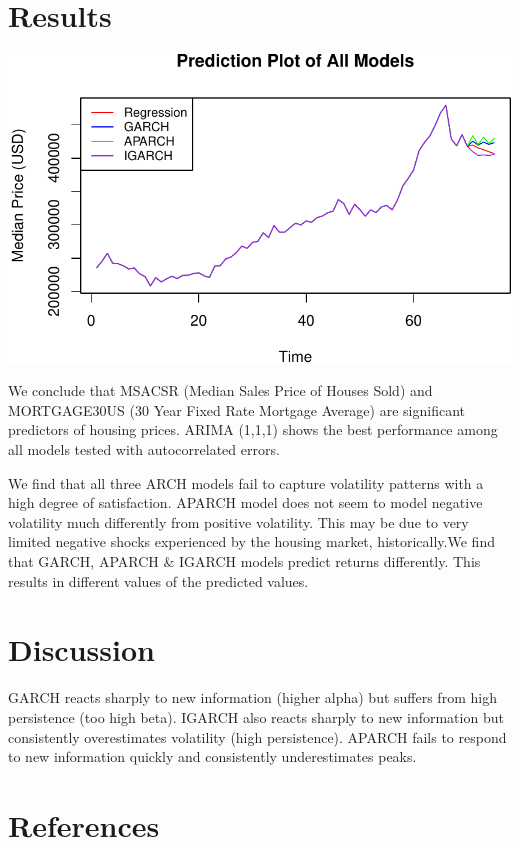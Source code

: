 \documentclass[
  man]{apa6}
\begin{document}
\section{Results}\label{results}

\includegraphics{STAT429Report_files/figure-latex/unnamed-chunk-21-1.pdf}

We conclude that MSACSR (Median Sales Price of Houses Sold) and MORTGAGE30US (30 Year Fixed Rate Mortgage Average) are significant predictors of housing prices. ARIMA (1,1,1) shows the best performance among all models tested with autocorrelated errors.

We find that all three ARCH models fail to capture volatility patterns with a high degree of satisfaction. APARCH model does not seem to model negative volatility much differently from positive volatility. This may be due to very limited negative shocks experienced by the housing market, historically.We find that GARCH, APARCH \& IGARCH models predict returns differently. This results in different values of the predicted values.

\section{Discussion}\label{discussion}

GARCH reacts sharply to new information (higher alpha) but suffers from high persistence (too high beta). IGARCH also reacts sharply to new information but consistently overestimates volatility (high persistence). APARCH fails to respond to new information quickly and consistently underestimates peaks.

\newpage

\section{References}\label{references}
\end{document}
